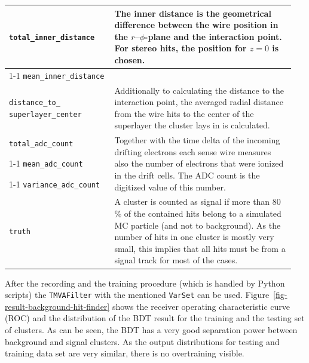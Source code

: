 \begin{table}
\begin{tabular}{p{0.35\linewidth}p{0.60\linewidth}}
   \verb+total_inner_distance+ & \multirow{3}{*}[-1.5pt]{\begin{minipage}{\linewidth} The inner distance is the geometrical difference between the wire position in the $r$--$\phi$-plane and the interaction point. For stereo hits, the position for $z = 0$ is chosen. \end{minipage}} \\[1ex] \cmidrule{1-1}
   \verb+mean_inner_distance+ & \\[1ex] \midrule
   \verb+distance_to_+ \verb+superlayer_center+ & Additionally to calculating the distance to the interaction point, the averaged radial distance from the wire hits to the center of the superlayer the cluster lays in is calculated. \\ \midrule 
   
   \verb+total_adc_count+ & \multirow{3}{*}[-1pt]{\begin{minipage}{\linewidth} Together with the time delta of the incoming drifting electrons each sense wire measures also the number of electrons that were ionized in the drift cells. The ADC count is the digitized value of this number. \end{minipage}} \\ \cmidrule{1-1}
   \verb+mean_adc_count+ & \\ \cmidrule{1-1}
   \verb+variance_adc_count+ & \\ \midrule
   \verb+truth+ & A cluster is counted as signal if more than 80 \% of the contained hits belong to a simulated MC particle (and not to background). As the number of hits in one cluster is mostly very small, this implies that all hits must be from a signal track for most of the cases. \\ \bottomrule
  \end{tabular}

  \label{tab-varset-cluster}
\end{table}

After the recording and the training procedure (which is handled by Python scripts) the \texttt{TMVAFilter} with the mentioned \texttt{VarSet} can be used. Figure~\ref{fig-result-background-hit-finder} shows the receiver operating characteristic curve (ROC) and the distribution of the BDT result for the training and the testing set of clusters. As can be seen, the BDT has a very good separation power between background and signal clusters. As the output distributions for testing and training data set are very similar, there is no overtraining visible.

